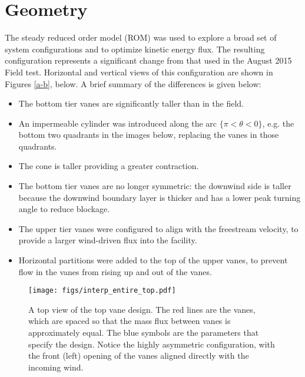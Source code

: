 \label{sec:field}

\section{Geometry}

The steady reduced order model (ROM) was used to explore a broad set of
system configurations and to optimize kinetic energy flux. The resulting
configuration represents a significant change from that used in the
August 2015 Field test. Horizontal and vertical views of this
configuration are shown in Figures \ref{a-b}, below. A brief summary of
the differences is given below: 

\begin{itemize}
\item The bottom tier vanes are significantly taller than in the field.
\item An impermeable cylinder was introduced along the arc $\{\pi < \theta
      < 0 \}$, e.g. the bottom two quadrants in the images below, replacing the
vanes in those quadrants. 
\item The cone is taller providing a greater contraction.
\item The bottom tier vanes are no longer symmetric: the downwind side is
taller because the downwind boundary layer is thicker and has a lower
peak turning angle to reduce blockage.
\item The upper tier vanes were configured to align with the freestream
velocity, to provide a larger wind-driven flux into the facility.
\item Horizontal partitions were added to the top of the upper vanes, to
prevent flow in the vanes from rising up and out of the vanes. 
\end{itemize}

 \begin{figure}[!htb]
  \begin{center}
   \texttt{[image: figs/interp\_entire\_top.pdf]}
   \caption{A top view of the top vane design. The red lines are the
     vanes, which are spaced so that the mass flux between vanes is
     approximately equal. The blue symbols are the parameters that
     specify the design. Notice the highly asymmetric configuration,
     with the front (left) opening of the vanes aligned directly with
     the incoming wind.}
   \label{fig:top_design}
  \end{center}
 \end{figure}

